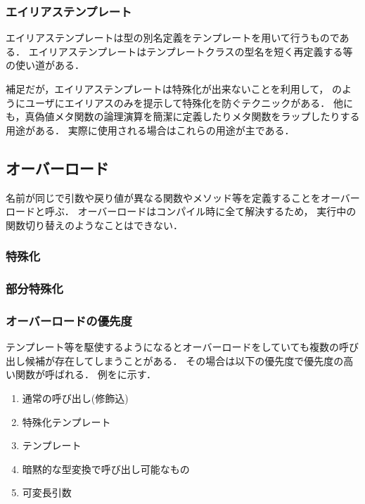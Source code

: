 
\subsubsection*{エイリアステンプレート}
エイリアステンプレートは型の別名定義をテンプレートを用いて行うものである．
エイリアステンプレートはテンプレートクラスの型名を短く再定義する等
の使い道がある．


補足だが，エイリアステンプレートは特殊化が出来ないことを利用して，
のようにユーザにエイリアスのみを提示して特殊化を防ぐテクニックがある．
他にも，真偽値メタ関数の論理演算を簡潔に定義したりメタ関数をラップしたりする用途がある．
実際に使用される場合はこれらの用途が主である．

\subsection{オーバーロード}
名前が同じで引数や戻り値が異なる関数やメソッド等を定義することをオーバーロードと呼ぶ．
オーバーロードはコンパイル時に全て解決するため，
実行中の関数切り替えのようなことはできない．


\subsubsection{特殊化}



\subsubsection{部分特殊化}


\subsubsection{オーバーロードの優先度}
テンプレート等を駆使するようになるとオーバーロードをしていても複数の呼び出し候補が存在してしまうことがある．
その場合は以下の優先度で優先度の高い関数が呼ばれる．
例をに示す．
\begin{enumerate}
    \item 通常の呼び出し(修飾込)
    \item 特殊化テンプレート
    \item テンプレート
    \item 暗黙的な型変換で呼び出し可能なもの
    \item 可変長引数
\end{enumerate}

